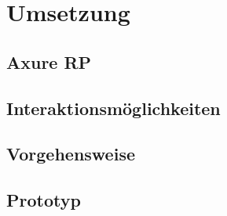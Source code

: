 \chapter{Umsetzung}\label{ch:experiments}

\section {Axure RP}
\section{Interaktionsmöglichkeiten}
\section{Vorgehensweise}
\section{Prototyp}
